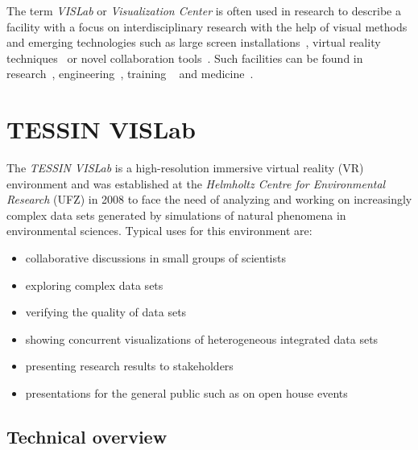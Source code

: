 \documentclass[twocolumn]{svjour3}          %
\begin{document}
The term \emph{VISLab} or \emph{Visualization Center} is often used in research to describe a facility with a focus on interdisciplinary research with the help of visual methods and emerging technologies such as large screen installations~\cite{web:kaust}, virtual reality techniques~\cite{bryson:vr,burdea:vr} or novel collaboration tools~\cite{johnson:tele-immersivecollaboration}. Such facilities can be found in research~\cite{web:vr-science}, engineering~\cite{web:vr-engineering}, training ~\cite{seymour:vror} and medicine~\cite{web:vr-medicine}.

\section{TESSIN VISLab}
\label{tessin-vislab}

The \emph{TESSIN VISLab} is a high-resolution immersive virtual reality (VR) environment and was established at the \emph{Helmholtz Centre for Environmental Research} (UFZ) in 2008 to face the need of analyzing and working on increasingly complex data sets generated by simulations of natural phenomena in environmental sciences. Typical uses for this environment are:

\begin{itemize}
\itemsep1pt\parskip0pt
\item
  collaborative discussions in small groups of scientists
\item
  exploring complex data sets
\item
  verifying the quality of data sets
\item
  showing concurrent visualizations of heterogeneous integrated data sets
\item
  presenting research results to stakeholders
\item
  presentations for the general public such as on open house events
\end{itemize}

\subsection{Technical overview}
\label{technical-overview}
\end{document}
